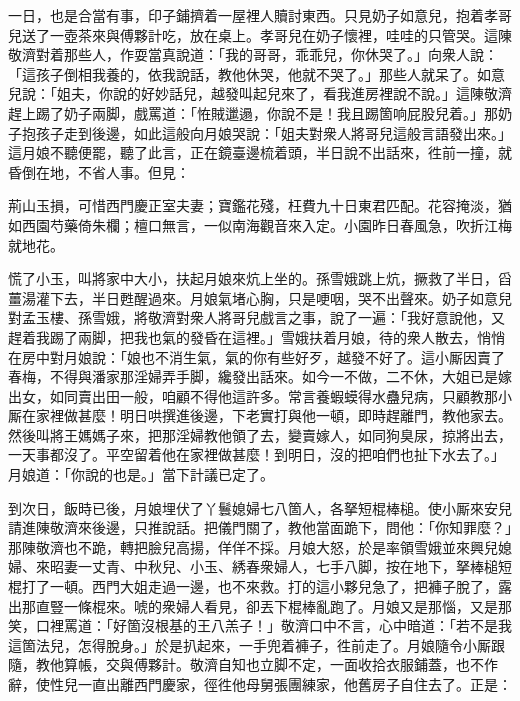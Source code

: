 一日，也是合當有事，印子鋪擠着一屋裡人贖討東西。只見奶子如意兒，抱着孝哥兒送了一壺茶來與傅夥計吃，放在桌上。孝哥兒在奶子懷裡，哇哇的只管哭。這陳敬濟對着那些人，作耍當真說道：「我的哥哥，乖乖兒，你休哭了。」向衆人說：「這孩子倒相我養的，依我說話，教他休哭，他就不哭了。」{}那些人就呆了。如意兒說：「姐夫，你說的好妙話兒，越發叫起兒來了，看我進房裡說不說。」這陳敬濟趕上踢了奶子兩脚，戲罵道：「恠賊邋遢，你說不是！我且踢箇响屁股兒着。」{}那奶子抱孩子走到後邊，如此這般向月娘哭說：「姐夫對衆人將哥兒這般言語發出來。」這月娘不聽便罷，聽了此言，正在鏡臺邊梳着頭，半日說不出話來，徃前一撞，就昏倒在地，不省人事。但見：

\begin{myquote}
荊山玉損，可惜西門慶正室夫妻；寶鑑花殘，枉費九十日東君匹配。花容掩淡，猶如西園芍藥倚朱欄；檀口無言，一似南海觀音來入定。小園昨日春風急，吹折江梅就地花。
\end{myquote}

慌了小玉，叫將家中大小，扶起月娘來炕上坐的。孫雪娥跳上炕，撅救了半日，舀薑湯灌下去，半日甦醒過來。月娘氣堵心胸，只是哽咽，哭不出聲來。奶子如意兒對孟玉樓、孫雪娥，將敬濟對衆人將哥兒戲言之事，說了一遍：「我好意說他，又趕着我踢了兩脚，把我也氣的發昏在這裡。」雪娥扶着月娘，待的衆人散去，悄悄在房中對月娘說：「娘也不消生氣，氣的你有些好歹，越發不好了。這小厮因賣了春梅，不得與潘家那淫婦弄手脚，纔發出話來。如今一不做，二不休，大姐已是嫁出女，如同賣出田一般，咱顧不得他這許多。常言養蝦蟆得水蠱兒病，只顧教那小厮在家裡做甚麼！明日哄撰進後邊，下老實打與他一頓，即時趕離門，教他家去。然後叫將王媽媽子來，把那淫婦教他領了去，變賣嫁人，如同狗臭尿，掠將出去，一天事都沒了。平空留着他在家裡做甚麼！到明日，沒的把咱們也扯下水去了。」{}月娘道：「你說的也是。」當下計議已定了。

到次日，飯時已後，月娘埋伏了丫鬟媳婦七八箇人，各拏短棍棒槌。使小厮來安兒請進陳敬濟來後邊，只推說話。把儀門關了，教他當面跪下，問他：「你知罪麼？」那陳敬濟也不跪，轉把臉兒高揚，佯佯不採。月娘大怒，於是率領雪娥並來興兒媳婦、來昭妻一丈青、中秋兒、小玉、綉春衆婦人，七手八脚，按在地下，拏棒槌短棍打了一頓。西門大姐走過一邊，也不來救。打的這小夥兒急了，把褲子脫了，露出那直豎一條棍來。{}唬的衆婦人看見，卻丟下棍棒亂跑了。月娘又是那惱，又是那笑，口裡罵道：「好箇沒根基的王八羔子！」敬濟口中不言，心中暗道：「若不是我這箇法兒，怎得脫身。」於是扒起來，一手兜着褲子，徃前走了。月娘隨令小厮跟隨，教他算帳，交與傅夥計。敬濟自知也立脚不定，一面收拾衣服鋪蓋，也不作辭，使性兒一直出離西門慶家，徑徃他母舅張團練家，他舊房子自住去了。正是：

